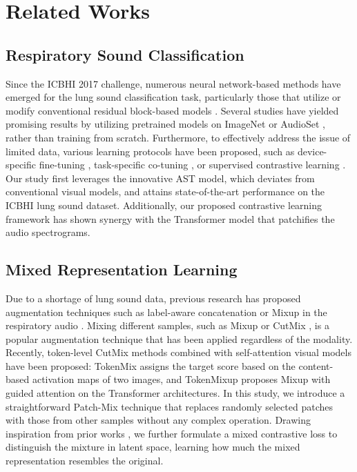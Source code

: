 \documentclass{INTERSPEECH2023}
\begin{document}
\section{Related Works}


\subsection{Respiratory Sound Classification}
\vspace{-2pt}

Since the ICBHI 2017 challenge, numerous neural network-based methods have emerged for the lung sound classification task, particularly those that utilize or modify conventional residual block-based models \cite{ma2020lungrn+, yang2020adventitious, gairola2021respirenet,  nguyen2022lung, ma2019lungbrn, wang2022domain, li2021lungattn}.
Several studies have yielded promising results by utilizing pretrained models on ImageNet \cite{gairola2021respirenet, nguyen2022lung, wang2022domain} or AudioSet \cite{moummad2022supervised}, rather than training from scratch. 
Furthermore, to effectively address the issue of limited data, various learning protocols have been proposed, such as device-specific fine-tuning \cite{gairola2021respirenet}, task-specific co-tuning \cite{nguyen2022lung}, or supervised contrastive learning \cite{moummad2022supervised}. 
Our study first leverages the innovative AST model, which deviates from conventional visual models, and attains state-of-the-art performance on the ICBHI lung sound dataset. Additionally, our proposed contrastive learning framework has shown synergy with the Transformer model that patchifies the audio spectrograms.
\vspace{-5pt}





\subsection{Mixed Representation Learning}
\vspace{-2pt}


Due to a shortage of lung sound data, previous research has proposed augmentation techniques such as label-aware concatenation \cite{gairola2021respirenet} or Mixup in the respiratory audio \cite{ma2020lungrn+, wang2022domain}. Mixing different samples, such as Mixup \cite{zhang2017mixup} or CutMix \cite{yun2019cutmix}, is a popular augmentation technique that has been applied regardless of the modality. Recently, token-level CutMix methods combined with self-attention visual models have been proposed: TokenMix \cite{liu2022tokenmix} assigns the target score based on the content-based activation maps of two images, and TokenMixup \cite{choi2022tokenmixup} proposes Mixup with guided attention on the Transformer architectures. 
In this study, we introduce a straightforward Patch-Mix technique that replaces randomly selected patches with those from other samples without any complex operation. 
Drawing inspiration from prior works \cite{kim2020mixco, lee2020mix}, we further formulate a mixed contrastive loss to distinguish the mixture in latent space, learning how much the mixed representation resembles the original.
 
\end{document}

